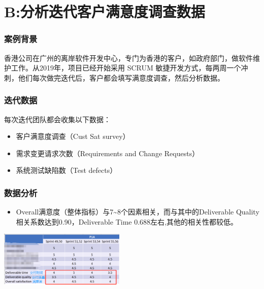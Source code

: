 \chapter{B:分析迭代客户满意度调查数据} %

\hypertarget{ux6848ux4f8bux80ccux666f}{%
\subsection{案例背景}\label{ux6848ux4f8bux80ccux666f}}

香港公司在广州的离岸软件开发中心，专门为香港的客户，如政府部门，做软件维护工作。从2019年，项目已经开始采用
SCRUM
敏捷开发方式，每两周一个冲刺，他们每次做完迭代后，客户都会填写满意度调查，然后分析数据。

\hypertarget{ux8fedux4ee3ux6570ux636e}{%
\subsection{迭代数据}\label{ux8fedux4ee3ux6570ux636e}}

每次迭代团队都会收集以下数据：

\begin{itemize}
\tightlist
\item
  客户满意度调查（Cust Sat survey）
\item
  需求变更请求次数（Requirements and Change Requests）
\item
  系统测试缺陷数（Test defects）
\end{itemize}

\hypertarget{ux6570ux636eux5206ux6790}{%
\subsection{数据分析}\label{ux6570ux636eux5206ux6790}}

\begin{itemize}
\tightlist
\item
  Overall满意度（整体指标）与7\textasciitilde{}8个因素相关，而与其中的Deliverable
  Quality相关系数达到0.90，Deliverable Time
  0.688左右,其他的相关性都较低。
\end{itemize}


\includegraphics[width=6cm]{微信截图_20230625135709.png}

